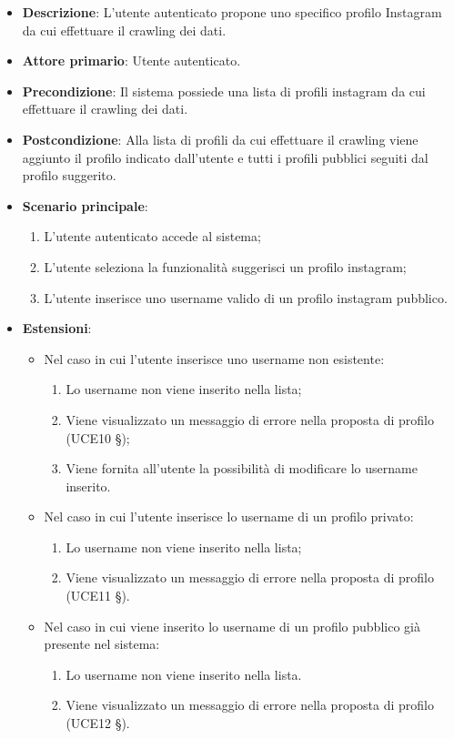 \begin{itemize}
	\item \textbf{Descrizione}: L'utente autenticato propone uno specifico profilo Instagram da cui effettuare il crawling dei dati.
    \item \textbf{Attore primario}: Utente autenticato.
    \item \textbf{Precondizione}: Il sistema possiede una lista di profili instagram da cui effettuare il crawling dei dati.
    \item \textbf{Postcondizione}: Alla lista di profili da cui effettuare il crawling viene aggiunto il profilo indicato dall’utente e tutti i profili pubblici seguiti dal profilo suggerito.
    \item \textbf{Scenario principale}: 
    \begin{enumerate}
        \item L'utente autenticato accede al sistema;
        \item L’utente seleziona la funzionalità suggerisci un profilo instagram;
        \item L’utente inserisce uno username valido di un profilo instagram pubblico.
    \end{enumerate}
    \item \textbf{Estensioni}:
    \begin{itemize}
        \item Nel caso in cui l’utente inserisce uno username non esistente:
        \begin{enumerate}
            \item Lo username non viene inserito nella lista;
            \item Viene visualizzato un messaggio di errore nella proposta di profilo (UCE10 §);
            \item Viene fornita all’utente la possibilità di modificare lo username inserito.
        \end{enumerate}
        \item Nel caso in cui l’utente inserisce lo username di un profilo privato:
        \begin{enumerate}
            \item Lo username non viene inserito nella lista;
            \item Viene visualizzato un messaggio di errore nella proposta di profilo (UCE11 §).
        \end{enumerate}
        \item Nel caso in cui viene inserito lo username di un profilo pubblico già presente nel sistema:
        \begin{enumerate}
            \item Lo username non viene inserito nella lista.
            \item Viene visualizzato un messaggio di errore nella proposta di profilo (UCE12 §).
        \end{enumerate} 
    \end{itemize}
\end{itemize}

